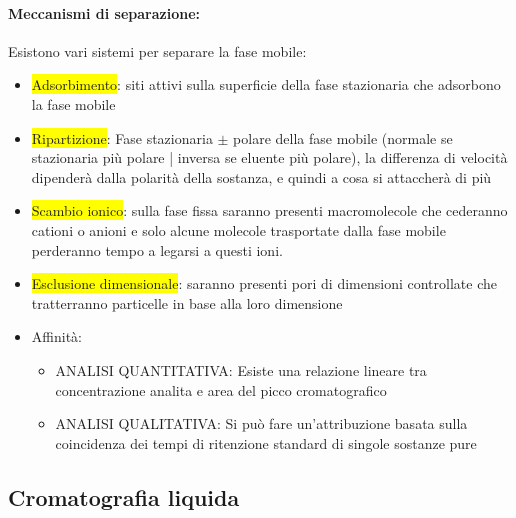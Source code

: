 \documentclass{article}
\begin{document}
\paragraph{Meccanismi di separazione: }Esistono vari sistemi per separare la fase mobile:
\begin{itemize}
	\item \colorbox{yellow}{Adsorbimento}: siti attivi sulla superficie della fase stazionaria che adsorbono la fase mobile
	\item \colorbox{yellow}{Ripartizione}: Fase stazionaria $\pm$ polare della fase mobile (normale se stazionaria più polare | inversa se eluente più polare), la differenza di velocità dipenderà dalla polarità della sostanza, e quindi a cosa si attaccherà di più
	\item \colorbox{yellow}{Scambio ionico}: sulla fase fissa saranno presenti macromolecole che cederanno cationi o anioni e solo alcune molecole trasportate dalla fase mobile perderanno tempo a legarsi a questi ioni.
	\item \colorbox{yellow}{Esclusione dimensionale}: saranno presenti pori di dimensioni controllate che tratterranno particelle in base alla loro dimensione
	\item Affinità: 
	\begin{itemize}
		\item ANALISI QUANTITATIVA: Esiste una relazione lineare tra concentrazione analita e area del picco cromatografico
		\item ANALISI QUALITATIVA: Si può fare un'attribuzione basata sulla coincidenza dei tempi di ritenzione standard di singole sostanze pure 
	\end{itemize}
\end{itemize}

\subsection{Cromatografia liquida}
\end{document}
